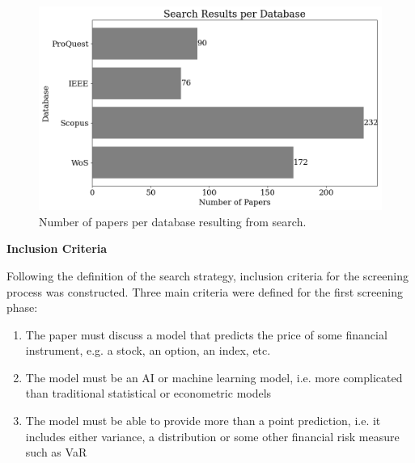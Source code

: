 \begin{figure}[H]
    \centering
    \includegraphics[width=1\linewidth]{Images/search_sample_by_database.png}
    \caption[Number of papers per database from search]{Number of papers per database resulting from search.}
    \label{fig:search_sample_by_database}
\end{figure}



\textbf{Inclusion Criteria}\nopagebreak

Following the definition of the search strategy, inclusion criteria for the screening process was constructed. Three main criteria were defined for the first screening phase:

\begin{enumerate}
    \item The paper must discuss a model that predicts the price of some financial instrument, e.g. a stock, an option, an index, etc.
    \item The model must be an AI or machine learning model, i.e. more complicated than traditional statistical or econometric models
    \item The model must be able to provide more than a point prediction, i.e. it includes either variance, a distribution or some other financial risk measure such as VaR
\end{enumerate}

